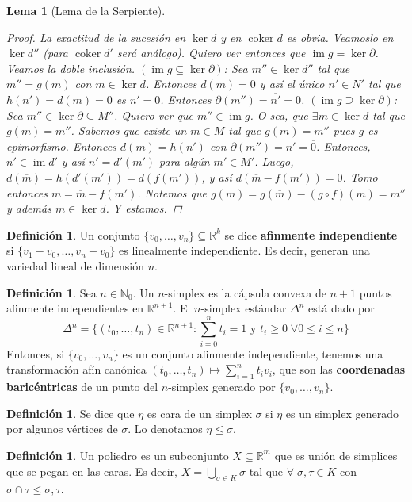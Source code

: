 \documentclass[12pt]{book}
\newtheorem{lem}[teo]{Lema}
\theoremstyle{definition}
\newtheorem{defn}[teo]{Definición}
\newcommand{\RR}{\mathbb{R}}      %
\newcommand{\NN}{\mathbb{N}}
\DeclareMathOperator{\im}{im}
\DeclareMathOperator{\coker}{coker}
\begin{document}
\begin{lem}[Lema de la Serpiente]
\begin{proof}
La exactitud de la sucesión en $\ker d$ y en $\coker d$ es obvia. Veamoslo en $\ker d''$ (para $\coker d'$ será análogo). Quiero ver entonces que $\im g = \ker \partial$. Veamos la doble inclusión. $(\im g\subseteq \ker \partial)$: Sea $m''\in \ker d''$ tal que $m''=g(m)$ con $m\in \ker d$. Entonces $d(m)=0$ y así el único $n'\in N'$ tal que $h(n')=d(m)=0$ es $n'=0$. Entonces $\partial(m'')=\overline{n'}=\overline{0}$. $(\im g\supseteq \ker\partial)$: Sea $m''\in\ker \partial\subseteq M''$. Quiero ver que $m''\in\im g$. O sea, que $\exists m\in\ker d$ tal que $g(m)=m''$. Sabemos que existe un $\overline{m}\in M$ tal que $g(\overline{m})=m''$ pues $g$ es epimorfismo. Entonces $d(\overline{m})=h(n')$ con $\partial(m'')=\overline{n'}=\overline{0}$. Entonces, $n'\in \im d'$ y así $n'=d'(m')$ para algún $m'\in M'$. Luego, $d(\overline{m}) = h(d'(m')) = d(f(m'))$, y así $d(\overline{m}-f(m'))=0$. Tomo entonces $m=\overline{m}-f(m')$. Notemos que $g(m)=g(\overline{m}) - (g\circ f)(m) = m''$ y además $m\in\ker d$. Y estamos.

\end{proof}
\end{lem}

\begin{defn}
Un conjunto $\{v_0,\ldots , v_n\}\subseteq \RR^k$ se dice \textbf{afinmente independiente} si $\{v_1-v_0,\ldots , v_n-v_0\}$ es linealmente independiente. Es decir, generan una variedad lineal de dimensión $n$.
\end{defn}

\begin{defn}
Sea $n\in\NN_0$. Un $n$-simplex es la cápsula convexa de $n+1$ puntos afinmente independientes en $\RR^{n+1}$. El $n$-simplex estándar $\Delta^n$ está dado por $$\Delta^n = \{(t_0,\ldots , t_n) \in \RR^{n+1} : \displaystyle\sum_{i=0}^n t_i = 1 \text{ y } t_i\geq 0 \;\forall 0\leq i\leq n\}$$ Entonces, si $\{v_0,\ldots ,v_n\}$ es un conjunto afinmente independiente, tenemos una transformación afín canónica $(t_0,\ldots ,t_n)\mapsto \displaystyle\sum_{i=1}^n t_i v_i$, que son las \textbf{coordenadas baricéntricas} de un punto del $n$-simplex generado por $\{v_0,\ldots , v_n\}$.
\end{defn}

\begin{defn}
Se dice que $\eta$ es cara de un simplex $\sigma$ si $\eta$ es un simplex generado por algunos vértices de $\sigma$. Lo denotamos $\eta \leq \sigma$.
\end{defn}

\begin{defn}
Un poliedro es un subconjunto $X\subseteq \RR^m$ que es unión de simplices que se pegan en las caras. Es decir, $X=\displaystyle\bigcup_{\sigma\in K}\sigma$ tal que $\forall\;\sigma,\tau\in K$ con $\sigma\cap\tau\leq \sigma,\tau$.
\end{defn}
\end{document}
